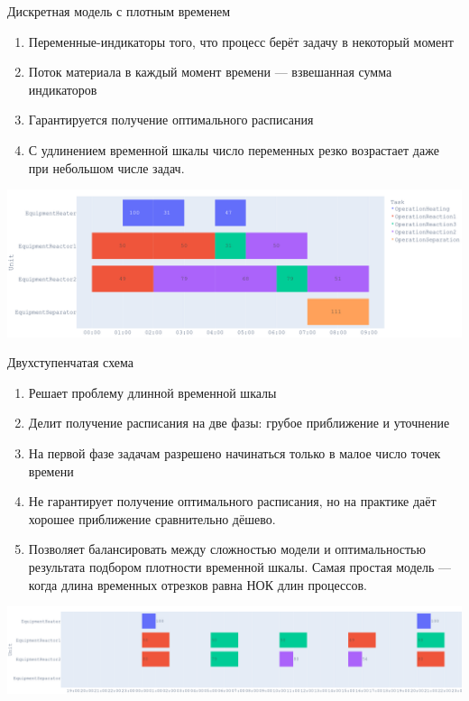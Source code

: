 \documentclass{beamer}
\begin{document}
\begin{frame}{Дискретная модель с плотным временем}
	\begin{enumerate}
	\item Переменные-индикаторы того, что процесс берёт задачу в некоторый момент
	\item Поток материала в каждый момент времени --- взвешанная сумма индикаторов
	\item Гарантируется получение оптимального расписания
	\item С удлинением временной шкалы число переменных резко возрастает даже при небольшом числе задач.
\end{enumerate}

\begin{center}
\includegraphics[width=1.0\textwidth]{plan}
\end{center}

\end{frame}

\begin{frame}{Двухступенчатая схема}
	\begin{enumerate}
	\item Решает проблему длинной временной шкалы
	\item Делит получение расписания на две фазы: грубое приближение и уточнение
	\item На первой фазе задачам разрешено начинаться только в малое число точек времени
	\item Не гарантирует получение оптимального расписания, но на практике даёт хорошее приближение сравнительно дёшево.
	\item Позволяет балансировать между сложностью модели и оптимальностью результата подбором плотности временной шкалы. Самая простая модель --- когда длина временных отрезков равна НОК длин процессов.
\end{enumerate}

\begin{center}
\includegraphics[width=1.0\textwidth]{plan sparsed}
\end{center}

\end{frame}
\end{document}
